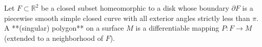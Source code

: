 Let $F \subset \mathbb{R}^2$ be a closed subset homeomorphic to a disk whose boundary $\partial F$ is a piecewise smooth simple closed curve with all exterior angles strictly less than $\pi$. A **(singular) polygon** on a surface $M$ is a differentiable mapping $P: F \to M$ (extended to a neighborhood of $F$).
